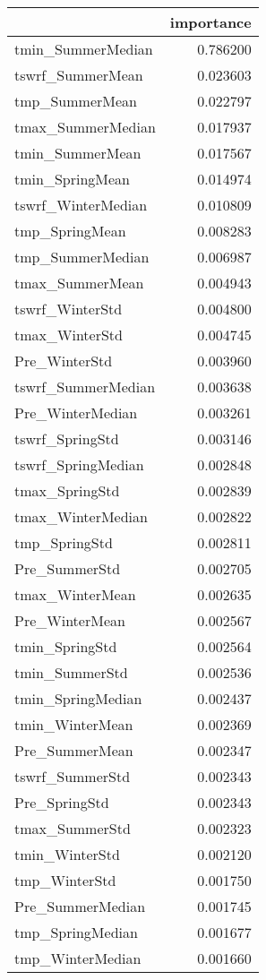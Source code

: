 \begin{tabular}{lr}
\toprule
 & importance \\
\midrule
tmin_SummerMedian & 0.786200 \\
tswrf_SummerMean & 0.023603 \\
tmp_SummerMean & 0.022797 \\
tmax_SummerMedian & 0.017937 \\
tmin_SummerMean & 0.017567 \\
tmin_SpringMean & 0.014974 \\
tswrf_WinterMedian & 0.010809 \\
tmp_SpringMean & 0.008283 \\
tmp_SummerMedian & 0.006987 \\
tmax_SummerMean & 0.004943 \\
tswrf_WinterStd & 0.004800 \\
tmax_WinterStd & 0.004745 \\
Pre_WinterStd & 0.003960 \\
tswrf_SummerMedian & 0.003638 \\
Pre_WinterMedian & 0.003261 \\
tswrf_SpringStd & 0.003146 \\
tswrf_SpringMedian & 0.002848 \\
tmax_SpringStd & 0.002839 \\
tmax_WinterMedian & 0.002822 \\
tmp_SpringStd & 0.002811 \\
Pre_SummerStd & 0.002705 \\
tmax_WinterMean & 0.002635 \\
Pre_WinterMean & 0.002567 \\
tmin_SpringStd & 0.002564 \\
tmin_SummerStd & 0.002536 \\
tmin_SpringMedian & 0.002437 \\
tmin_WinterMean & 0.002369 \\
Pre_SummerMean & 0.002347 \\
tswrf_SummerStd & 0.002343 \\
Pre_SpringStd & 0.002343 \\
tmax_SummerStd & 0.002323 \\
tmin_WinterStd & 0.002120 \\
tmp_WinterStd & 0.001750 \\
Pre_SummerMedian & 0.001745 \\
tmp_SpringMedian & 0.001677 \\
tmp_WinterMedian & 0.001660 \\

\end{tabular}
